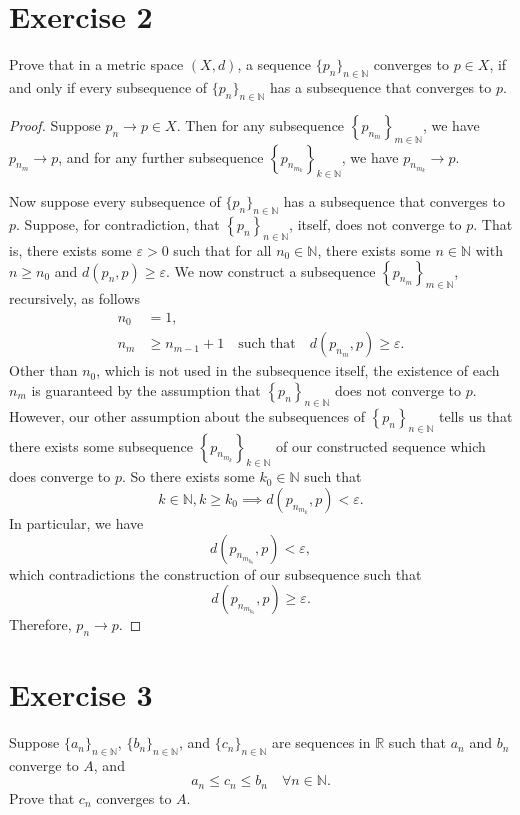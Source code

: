 \documentclass[12pt]{article}
\newenvironment{problem}
    {\begin{lrbox}{\mybox}\begin{minipage}{\textwidth-10pt}}
    {\end{minipage}\end{lrbox}\framebox[6.5in]{\usebox{\mybox}}}
\newcommand{\isp}[1]{\quad\text{#1}\quad}
\newcommand{\seq}[2][n]{\left\{#2\right\}_{#1\in\N}}
\newcommand{\<}{\left\langle}
\renewcommand{\>}{\right\rangle}
\newcommand{\N}{\mathbb{N}}
\let\eps\varepsilon
\begin{document}
\section*{Exercise 2}
\begin{problem}
    Prove that in a metric space $(X,d)$, a sequence $\{p_n\}_{n\in\mathbb{N}}$ converges to $p\in X$, if and only if every subsequence of $\{p_n\}_{n\in\mathbb{N}}$ has a subsequence that converges to $p$. 
\end{problem}

\begin{proof}
    Suppose $p_n\to p\in X$. Then for any subsequence $\seq[m]{p_{n_m}}$, we have $p_{n_m} \to p$, and for any further subsequence $\seq[k]{p_{n_{m_k}}}$, we have $p_{n_{m_k}} \to p$.
    
    Now suppose every subsequence of $\{p_n\}_{n\in\mathbb{N}}$ has a subsequence that converges to $p$. Suppose, for contradiction, that $\seq{p_n}$, itself, does not converge to $p$. That is, there exists some $\eps>0$ such that for all $n_0\in\N$, there exists some $n\in\N$ with $n\geq n_0$ and $d(p_n, p) \geq \eps$. We now construct a subsequence $\seq[m]{p_{n_m}}$, recursively, as follows
    \begin{align*}
        n_0 &= 1, \\
        n_m &\geq n_{m-1}+1 \isp{such that} d(p_{n_m}, p) \geq \eps.
    \end{align*}
    Other than $n_0$, which is not used in the subsequence itself, the existence of each $n_m$ is guaranteed by the assumption that $\seq{p_n}$ does not converge to $p$. However, our other assumption about the subsequences of $\seq{p_n}$ tells us that there exists some subsequence $\seq[k]{p_{n_{m_k}}}$ of our constructed sequence which does converge to $p$. So there exists some $k_0\in\N$ such that
    \[k\in\N, k\geq k_0 \implies d(p_{n_{m_k}}, p) < \eps.\]
    In particular, we have
    \[d(p_{n_{m_{k_0}}}, p) < \eps,\]
    which contradictions the construction of our subsequence such that
    \[d(p_{n_{m_{k_0}}}, p) \geq \eps.\]
    Therefore, $p_n\to p$.

\end{proof}

\newpage
\section*{Exercise 3}
\begin{problem}
    Suppose $\{a_n\}_{n \in \mathbb{N}}$, $\{b_n\}_{n \in \mathbb{N}}$, and $\{c_n\}_{n \in \mathbb{N}}$ are sequences in $\mathbb{R}$ such that $a_n$ and $b_n$ converge to $A$, and 
    \begin{equation*}
    a_n \le c_n \le b_n\quad \forall n\in\mathbb{N}.
    \end{equation*}
    Prove that $c_n$ converges to $A$.
\end{problem}
\end{document}
